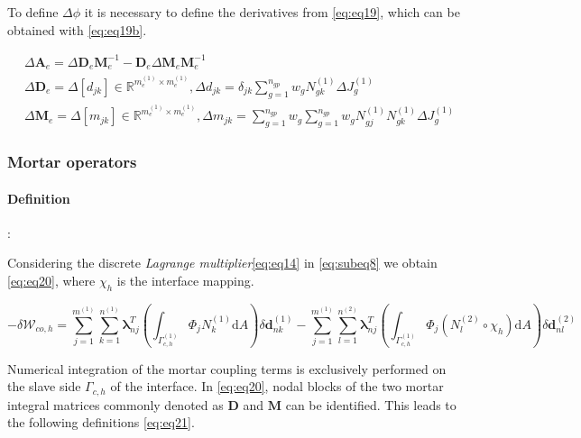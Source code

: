 \documentclass[a4paper,10pt]{article} %
\begin{document}
To define $\Delta \phi$ it is necessary to define the derivatives from \eqref{eq:eq19}, which can be obtained with \eqref{eq:eq19b}.

\begin{equation}\label{eq:eq19b}
    \begin{aligned}
        & \Delta \mathbf{A}_e = \Delta \mathbf{D}_e\mathbf{M}_e^{-1} - \mathbf{D}_e\Delta\mathbf{M}_e\mathbf{M}_e^{-1} \\
        &\Delta \mathbf{D}_e = \Delta[d_{jk}] \in \mathbb{R}^{m_e^{(1)} \times m_e^{(1)}}, \Delta d_{jk} = \delta_{jk} \sum_{g = 1}^{n_{gp}} w_g N_{gk}^{(1)} \Delta J_g^{(1)}  \\
        & \Delta \mathbf{M}_e = \Delta[m_{jk}] \in \mathbb{R}^{m_e^{(1)} \times m_e^{(1)}}, \Delta m_{jk} = \sum_{g = 1}^{n_{gp}} w_g  \sum_{g = 1}^{n_{gp}} w_g  N_{gj}^{(1)} N_{gk}^{(1)} \Delta J_g^{(1)}
    \end{aligned}
\end{equation}
 
\subsubsection{Mortar operators}

\paragraph{Definition}:

Considering the discrete \textit{Lagrange multiplier}\eqref{eq:eq14} in \eqref{eq:subeq8} we obtain \eqref{eq:eq20}, where $\chi_h$ is the interface mapping.

\begin{equation}\label{eq:eq20}
    -\delta \mathcal{W}_{co,h} = \sum_{j=1}^{m^{(1)}}\sum_{k=1}^{n^{(1)}} \boldsymbol{\lambda}_{nj}^T \left(\int_{\Gamma_{c,h}^{(1)}} \Phi_j N_k^{(1)} \text{d}A \right) \delta \mathbf{d}_{nk}^{(1)} -\sum_{j=1}^{m^{(1)}}\sum_{l=1}^{n^{(2)}} \boldsymbol{\lambda}_{nj}^T \left(\int_{\Gamma_{c,h}^{(1)}} \Phi_j \left(N_l^{(2)} \circ \chi_h\right) \text{d}A \right) \delta \mathbf{d}_{nl}^{(2)}
\end{equation}

Numerical integration of the mortar coupling terms is exclusively performed on the slave side $\Gamma_{c,h}$ of the interface. In \eqref{eq:eq20}, nodal blocks of the two mortar integral matrices commonly denoted as $\mathbf{D}$ and $\mathbf{M}$ can be identified. This leads to the following definitions \eqref{eq:eq21}.
\end{document}
